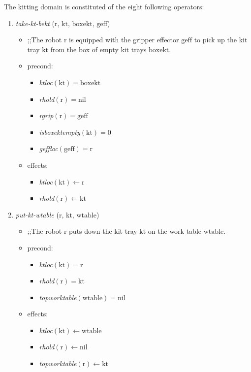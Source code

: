 The kitting domain is constituted of the eight following operators:
\begin{small}
\begin{enumerate}
\item \textsl{take-kt-bekt} ($\mathrm{r}$, $\mathrm{kt}$, $\mathrm{boxekt}$, $\mathrm{geff}$)
\begin{itemize}
\item ;;The robot $\mathrm{r}$ is equipped with the gripper effector $\mathrm{geff}$ to pick up the kit tray $\mathrm{kt}$ from the box of empty kit trays $\mathrm{boxekt}$.
\item precond:
\begin{itemize}
\item[]\emph{ktloc}$\mathrm{(kt)=boxekt}$
\item[]\emph{rhold}$\mathrm{(r)=nil}$
\item[]\emph{rgrip}$\mathrm{(r)=geff}$
\item[]\emph{isboxektempty}$\mathrm{(kt)=0}$
\item[]\emph{geffloc}$\mathrm{(geff)=r}$
\end{itemize}
\item effects:
\begin{itemize}
\item[]\emph{ktloc}$\mathrm{(kt)\leftarrow r}$
\item[]\emph{rhold}$\mathrm{(r)\leftarrow kt}$
\end{itemize}
\end{itemize}

\item \textsl{put-kt-wtable} ($\mathrm{r}$, $\mathrm{kt}$, $\mathrm{wtable}$)
\begin{itemize}
\item ;;The robot $\mathrm{r}$ puts down the kit tray $\mathrm{kt}$ on the work table $\mathrm{wtable}$.
\item precond:
\begin{itemize}
\item[]\emph{ktloc}$\mathrm{(kt)=r}$
\item[]\emph{rhold}$\mathrm{(r)=kt}$
\item[]\emph{topworktable}$\mathrm{(wtable)=nil}$
\end{itemize}
\item effects:
\begin{itemize}
\item[]\emph{ktloc}$\mathrm{(kt)\leftarrow wtable}$
\item[]\emph{rhold}$\mathrm{(r)\leftarrow nil}$
\item[]\emph{topworktable}$\mathrm{(r)\leftarrow kt}$
\end{itemize}
\end{itemize}


\end{enumerate}
\end{small}
